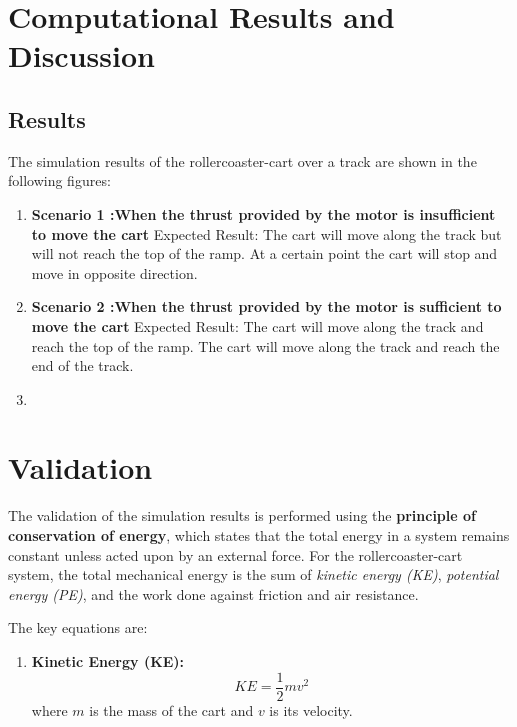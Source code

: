 \documentclass{article}
\begin{document}
\begin{itemize}
    \section{Computational Results and Discussion}
    \subsection{Results}
    The simulation results of the rollercoaster-cart over a track are shown in the following figures:
    \begin{enumerate}
        \item \textbf{Scenario 1 :}\newline \textbf{When the thrust provided by the motor is insufficient to move the cart}
        \newline
        Expected Result: The cart will move along the track but will not reach the top of the ramp. At a certain point the cart will stop and move in opposite direction.
        \item \textbf{Scenario 2 :}\newline \textbf{When the thrust provided by the motor is sufficient to move the cart}
        \newline
        Expected Result: The cart will move along the track and reach the top of the ramp. The cart will move along the track and reach the end of the track.
        \item 
    \end{enumerate}


    \section{Validation}
    The validation of the simulation results is performed using the \textbf{principle
    of conservation of energy}, which states that the total energy in a system remains
    constant unless acted upon by an external force. For the rollercoaster-cart
    system, the total mechanical energy is the sum of \textit{kinetic energy (KE)},
    \textit{potential energy (PE)}, and the work done against friction and air resistance.

    The key equations are:

    \begin{enumerate}
        \item \textbf{Kinetic Energy (KE):}
            \begin{equation}
                KE = \frac{1}{2}m v^{2}
            \end{equation}
            where $m$ is the mass of the cart and $v$ is its velocity.


\end{enumerate}
\end{itemize}
\end{document}
